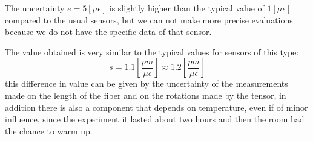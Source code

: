 The uncertainty $e = 5 [\mu\epsilon]$ is slightly higher than the typical value of $1 [\mu\epsilon]$ compared to the usual sensors, but we can not make more precise evaluations because we do not have the specific data of that sensor.

The value obtained is very similar to the typical values for sensors of this type:
$$s =  1.1 \left[\frac{pm}{\mu\epsilon}\right] \approx 1.2 \left[\frac{pm}{\mu\epsilon}\right]$$
this difference in value can be given by the uncertainty of the measurements made on the length of the fiber and on the rotations made by the tensor, in addition there is also a component that depends on temperature, even if of minor influence, since the experiment it lasted about two hours and then the room had the chance to warm up.
